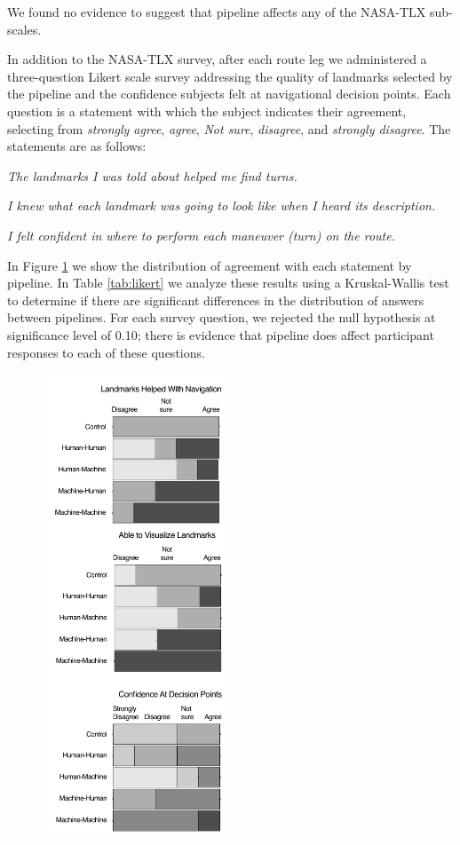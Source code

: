 We found no evidence to suggest that pipeline affects any of the NASA-TLX sub-scales.

In addition to the NASA-TLX survey, after each route leg we administered a three-question Likert scale survey addressing the quality of landmarks selected by the pipeline and the confidence subjects felt at navigational decision points. Each question is a statement with which the subject indicates their agreement, selecting from \textit{strongly agree}, \textit{agree}, \textit{Not sure}, \textit{disagree}, and  \textit{strongly disagree}. The statements are as follows:

\textit{The landmarks I was told about helped me find turns.}

\textit{I knew what each landmark was going to look like when I heard its description.}

\textit{I felt confident in where to perform each maneuver (turn) on the route.}

In Figure \ref{fig:plot:likert} we show the distribution of agreement with each statement by pipeline. In Table \ref{tab:likert} we analyze these results using a Kruskal-Wallis test to determine if there are significant differences in the distribution of answers between pipelines. For each survey question, we rejected the null hypothesis at significance level of 0.10; there is evidence that pipeline does affect participant responses to each of these questions. 

\begin{figure}[htbp]
  \centering
  \includegraphics[width=0.5\textwidth]{images/plot_likert.pdf}
  \caption{}
  \label{fig:plot:likert}
\end{figure}

